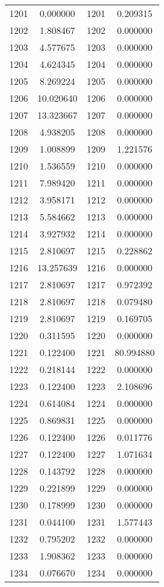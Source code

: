 \documentclass[12pt]{article}
\begin{document}
\begin{longtable}{@{}cccc@{}}
1201 & 0.000000 & 1201 & 0.209315 \\
1202 & 1.808467 & 1202 & 0.000000 \\
1203 & 4.577675 & 1203 & 0.000000 \\
1204 & 4.624345 & 1204 & 0.000000 \\
1205 & 8.269224 & 1205 & 0.000000 \\
1206 & 10.020640 & 1206 & 0.000000 \\
1207 & 13.323667 & 1207 & 0.000000 \\
1208 & 4.938205 & 1208 & 0.000000 \\
1209 & 1.008899 & 1209 & 1.221576 \\
1210 & 1.536559 & 1210 & 0.000000 \\
1211 & 7.989420 & 1211 & 0.000000 \\
1212 & 3.958171 & 1212 & 0.000000 \\
1213 & 5.584662 & 1213 & 0.000000 \\
1214 & 3.927932 & 1214 & 0.000000 \\
1215 & 2.810697 & 1215 & 0.228862 \\
1216 & 13.257639 & 1216 & 0.000000 \\
1217 & 2.810697 & 1217 & 0.972392 \\
1218 & 2.810697 & 1218 & 0.079480 \\
1219 & 2.810697 & 1219 & 0.169705 \\
1220 & 0.311595 & 1220 & 0.000000 \\
1221 & 0.122400 & 1221 & 80.994880 \\
1222 & 0.218144 & 1222 & 0.000000 \\
1223 & 0.122400 & 1223 & 2.108696 \\
1224 & 0.614084 & 1224 & 0.000000 \\
1225 & 0.869831 & 1225 & 0.000000 \\
1226 & 0.122400 & 1226 & 0.011776 \\
1227 & 0.122400 & 1227 & 1.071634 \\
1228 & 0.143792 & 1228 & 0.000000 \\
1229 & 0.221899 & 1229 & 0.000000 \\
1230 & 0.178999 & 1230 & 0.000000 \\
1231 & 0.044100 & 1231 & 1.577443 \\
1232 & 0.795202 & 1232 & 0.000000 \\
1233 & 1.908362 & 1233 & 0.000000 \\
1234 & 0.076670 & 1234 & 0.000000 \\

\end{longtable}
\end{document}
